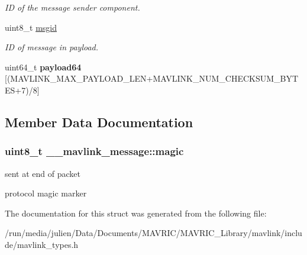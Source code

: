 \begin{DoxyCompactItemize}
\begin{DoxyCompactList}\small\item\em I\+D of the message sender component. \end{DoxyCompactList}\item 
\hypertarget{struct____mavlink__message_a8d95b61c61b9086bada158104828d593}{uint8\+\_\+t \hyperlink{struct____mavlink__message_a8d95b61c61b9086bada158104828d593}{msgid}}\label{struct____mavlink__message_a8d95b61c61b9086bada158104828d593}

\begin{DoxyCompactList}\small\item\em I\+D of message in payload. \end{DoxyCompactList}\item 
\hypertarget{struct____mavlink__message_a267401209e74271b7ded879bb0f44e73}{uint64\+\_\+t {\bfseries payload64} \mbox{[}(M\+A\+V\+L\+I\+N\+K\+\_\+\+M\+A\+X\+\_\+\+P\+A\+Y\+L\+O\+A\+D\+\_\+\+L\+E\+N+M\+A\+V\+L\+I\+N\+K\+\_\+\+N\+U\+M\+\_\+\+C\+H\+E\+C\+K\+S\+U\+M\+\_\+\+B\+Y\+T\+E\+S+7)/8\mbox{]}}\label{struct____mavlink__message_a267401209e74271b7ded879bb0f44e73}

\end{DoxyCompactItemize}


\subsection{Member Data Documentation}
\hypertarget{struct____mavlink__message_a2e6ee9d46821aea33a08231dea000355}{
\subsubsection[{magic}]{\setlength{\rightskip}{0pt plus 5cm}uint8\+\_\+t \+\_\+\+\_\+mavlink\+\_\+message\+::magic}}\label{struct____mavlink__message_a2e6ee9d46821aea33a08231dea000355}


sent at end of packet 

protocol magic marker 

The documentation for this struct was generated from the following file\+:\begin{DoxyCompactItemize}
\item 
/run/media/julien/\+Data/\+Documents/\+M\+A\+V\+R\+I\+C/\+M\+A\+V\+R\+I\+C\+\_\+\+Library/mavlink/include/mavlink\+\_\+types.\+h\end{DoxyCompactItemize}
